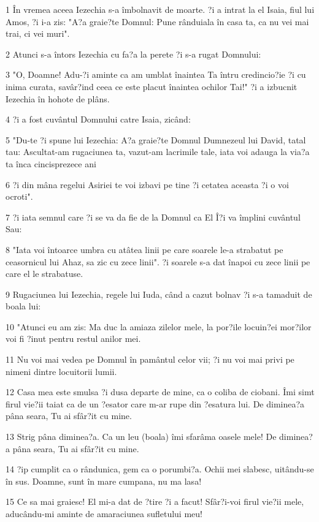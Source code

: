 \par 1 În vremea aceea Iezechia s-a îmbolnavit de moarte. ?i a intrat la el Isaia, fiul lui Amos, ?i i-a zis: "A?a graie?te Domnul: Pune rânduiala în casa ta, ca nu vei mai trai, ci vei muri".
\par 2 Atunci s-a întors Iezechia cu fa?a la perete ?i s-a rugat Domnului:
\par 3 "O, Doamne! Adu-?i aminte ca am umblat înaintea Ta întru credincio?ie ?i cu inima curata, savâr?ind ceea ce este placut înaintea ochilor Tai!" ?i a izbucnit Iezechia în hohote de plâns.
\par 4 ?i a fost cuvântul Domnului catre Isaia, zicând:
\par 5 "Du-te ?i spune lui Iezechia: A?a graie?te Domnul Dumnezeul lui David, tatal tau: Ascultat-am rugaciunea ta, vazut-am lacrimile tale, iata voi adauga la via?a ta înca cincisprezece ani
\par 6 ?i din mâna regelui Asiriei te voi izbavi pe tine ?i cetatea aceasta ?i o voi ocroti".
\par 7 ?i iata semnul care ?i se va da fie de la Domnul ca El Î?i va împlini cuvântul Sau:
\par 8 "Iata voi întoarce umbra cu atâtea linii pe care soarele le-a strabatut pe ceasornicul lui Ahaz, sa zic cu zece linii". ?i soarele s-a dat înapoi cu zece linii pe care el le strabatuse.
\par 9 Rugaciunea lui Iezechia, regele lui Iuda, când a cazut bolnav ?i s-a tamaduit de boala lui:
\par 10 "Atunci eu am zis: Ma duc la amiaza zilelor mele, la por?ile locuin?ei mor?ilor voi fi ?inut pentru restul anilor mei.
\par 11 Nu voi mai vedea pe Domnul în pamântul celor vii; ?i nu voi mai privi pe nimeni dintre locuitorii lumii.
\par 12 Casa mea este smulsa ?i dusa departe de mine, ca o coliba de ciobani. Îmi simt firul vie?ii taiat ca de un ?esator care m-ar rupe din ?esatura lui. De diminea?a pâna seara, Tu ai sfâr?it cu mine.
\par 13 Strig pâna diminea?a. Ca un leu (boala) îmi sfarâma oasele mele! De diminea?a pâna seara, Tu ai sfâr?it cu mine.
\par 14 ?ip cumplit ca o rândunica, gem ca o porumbi?a. Ochii mei slabesc, uitându-se în sus. Doamne, sunt în mare cumpana, nu ma lasa!
\par 15 Ce sa mai graiesc! El mi-a dat de ?tire ?i a facut! Sfâr?i-voi firul vie?ii mele, aducându-mi aminte de amaraciunea sufletului meu!
